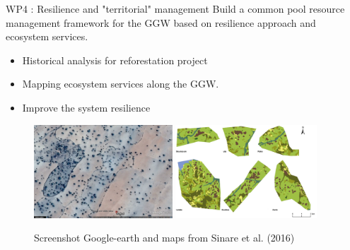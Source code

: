\documentclass[newPxFont]{beamer}
\begin{document}
\begin{frame}[c]{WP4 : Resilience and "territorial" management}
\vspace{-2em}
Build a common pool resource management framework for the GGW based on resilience approach and ecosystem services.
\begin{itemize}
  \item Historical analysis for reforestation project
  \item Mapping ecosystem services along the GGW.
  \item Improve the system resilience
\end{itemize}
\begin{figure}
	\centering
	\includegraphics[height = 3.5cm]{img/ggearth}
  \includegraphics[height = 3.5cm]{img/Sinare_et_al2016}
  \caption{\small{Screenshot Google-earth and maps from Sinare et al. (2016)}}
\end{figure}
\end{frame}
\end{document}

